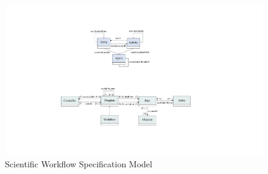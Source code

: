 \documentclass[ao]{iosart2x}
\begin{document}
\begin{figure}[h]
    \centering
    \includegraphics[width=0.9\linewidth]{figures/workflow-specs.pdf}
    \caption{Scientific Workflow Specification Model}
    \label{fig:workflow-specification}
\end{figure}
\end{document}
